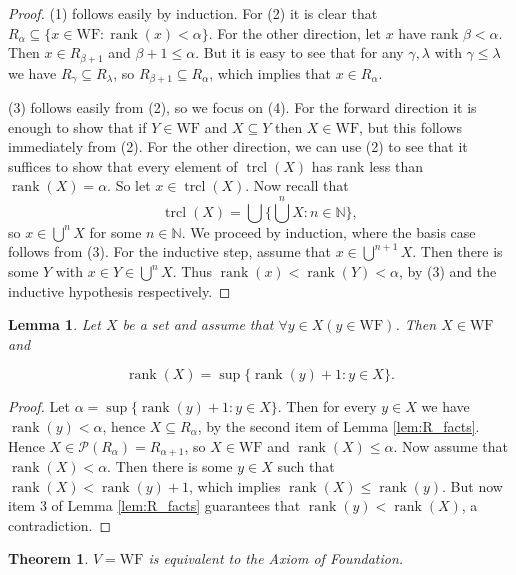 \documentclass{report}
\newtheorem{theorem}{Theorem}[section]
\newtheorem{lemma}{Lemma}[section]
\theoremstyle{definition}
\theoremstyle{remark}
\newcommand{\N}{\mathbb{N}}
\newcommand{\set}[1]{\{#1\}}
\newcommand{\powerset}[1]{\mathcal{P}\left (#1\right)}
\newcommand{\WF}{\mathrm{WF}}
\DeclareMathOperator{\rank}{rank}
\DeclareMathOperator{\trcl}{trcl}
\begin{document}
    \begin{proof}
        (1) follows easily by induction. For (2) it is clear that $R_\alpha \subseteq \set{x \in \WF : \rank(x) < \alpha}$. For the other direction, let $x$ have rank $\beta < \alpha$. Then $x \in R_{\beta+1}$ and $\beta+1 \leq \alpha$. But it is easy to see that for any $\gamma, \lambda$ with $\gamma \leq \lambda$ we have $R_\gamma \subseteq R_\lambda$, so $R_{\beta+1} \subseteq R_{\alpha}$, which implies that $x \in R_{\alpha}$.
    
        (3) follows easily from (2), so we focus on (4). For the forward direction it is enough to show that if $Y \in \WF$ and $X \subseteq Y$ then $X \in \WF$, but this follows immediately from (2). For the other direction, we can use (2) to see that it suffices to show that every element of $\trcl(X)$ has rank less than $\rank(X) = \alpha$. So let $x \in \trcl(X)$. Now recall that $$\trcl(X) = \bigcup\set{{\bigcup}^n X : n \in \N},$$ so $x \in \bigcup^n X$ for some $n \in \N$. We proceed by induction, where the basis case follows from (3). For the inductive step, assume that $x \in \bigcup^{n+1} X$. Then there is some $Y$ with $x \in Y \in \bigcup^n X$. Thus $\rank(x) < \rank(Y) < \alpha$, by (3) and the inductive hypothesis respectively.
    \end{proof}
    
    \begin{lemma} \label{lem:mem_WF_of_mems_WF}
        Let $X$ be a set and assume that $\forall y \in X (y \in \WF)$. Then $X \in \WF$ and
        
        \begin{equation*}
            \rank(X) = \sup\set{\rank(y) + 1 : y \in X}.
        \end{equation*}
    \end{lemma}
    
    \begin{proof}
        Let $\alpha = \sup\set{\rank(y) + 1 : y \in X}$. Then for every $y \in X$ we have $\rank(y) < \alpha$, hence $X \subseteq R_{\alpha}$, by the second item of Lemma \ref{lem:R_facts}. Hence $X \in \powerset{R_\alpha} = R_{\alpha + 1}$, so $X \in \WF$ and $\rank(X) \leq \alpha$. Now assume that $\rank(X) < \alpha$. Then there is some $y \in X$ such that $\rank(X) < \rank(y) + 1$, which implies $\rank(X) \leq \rank(y)$. But now item 3 of Lemma \ref{lem:R_facts} guarantees that $\rank(y) < \rank(X)$, a contradiction.
    \end{proof}
    
    \begin{theorem}
        $V = \WF$ is equivalent to the Axiom of Foundation.
    \end{theorem}
    
\end{document}
